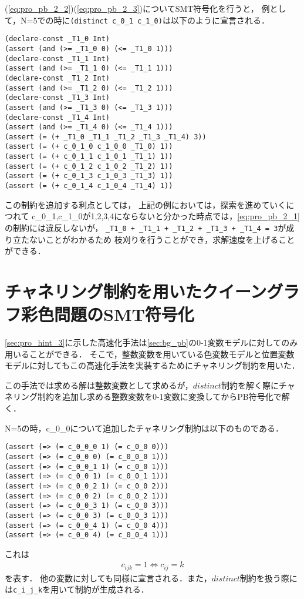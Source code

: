 (\ref{eq:pro_pb_2_2})(\ref{eq:pro_pb_2_3})についてSMT符号化を行うと，
例として，N=5での時に\verb|(distinct c_0_1 c_1_0)|は以下のように宣言される．

{ \footnotesize \begin{verbatim}
(declare-const _T1_0 Int)
(assert (and (>= _T1_0 0) (<= _T1_0 1)))
(declare-const _T1_1 Int)
(assert (and (>= _T1_1 0) (<= _T1_1 1)))
(declare-const _T1_2 Int)
(assert (and (>= _T1_2 0) (<= _T1_2 1)))
(declare-const _T1_3 Int)
(assert (and (>= _T1_3 0) (<= _T1_3 1)))
(declare-const _T1_4 Int)
(assert (and (>= _T1_4 0) (<= _T1_4 1)))
(assert (= (+ _T1_0 _T1_1 _T1_2 _T1_3 _T1_4) 3))
(assert (= (+ c_0_1_0 c_1_0_0 _T1_0) 1))
(assert (= (+ c_0_1_1 c_1_0_1 _T1_1) 1))
(assert (= (+ c_0_1_2 c_1_0_2 _T1_2) 1))
(assert (= (+ c_0_1_3 c_1_0_3 _T1_3) 1))
(assert (= (+ c_0_1_4 c_1_0_4 _T1_4) 1))
\end{verbatim}}

この制約を追加する利点としては，
上記の例においては，探索を進めていくにつれて
c\_0\_1,c\_1\_0が1,2,3,4にならないと分かった時点では，\ref{eq:pro_pb_2_1}の制約には違反しないが，
{\small \verb|_T1_0 + _T1_1 + _T1_2 + _T1_3 + _T1_4 = 3|}が成り立たないことがわかるため
枝刈りを行うことができ，求解速度を上げることができる．



%
%
\section{チャネリング制約を用いたクイーングラフ彩色問題のSMT符号化}\label{sec:pro_pb_c}
\ref{sec:pro_hint_3}に示した高速化手法は\ref{sec:bg_pb}の0-1変数モデルに対してのみ用いることができる．
そこで，整数変数を用いている色変数モデルと位置変数モデルに対してもこの高速化手法を実装するためにチャネリング制約を用いた．

この手法では求める解は整数変数として求めるが，$distinct$制約を解く際にチャネリング制約を追加し求める整数変数を0-1変数に変換してからPB符号化で解く．

N=5の時，c\_0\_0について追加したチャネリング制約は以下のものである．
{ \footnotesize \begin{verbatim}
(assert (=> (= c_0_0_0 1) (= c_0_0 0)))
(assert (=> (= c_0_0 0) (= c_0_0_0 1)))
(assert (=> (= c_0_0_1 1) (= c_0_0 1)))
(assert (=> (= c_0_0 1) (= c_0_0_1 1)))
(assert (=> (= c_0_0_2 1) (= c_0_0 2)))
(assert (=> (= c_0_0 2) (= c_0_0_2 1)))
(assert (=> (= c_0_0_3 1) (= c_0_0 3)))
(assert (=> (= c_0_0 3) (= c_0_0_3 1)))
(assert (=> (= c_0_0_4 1) (= c_0_0 4)))
(assert (=> (= c_0_0 4) (= c_0_0_4 1)))
\end{verbatim}}
これは
\begin{eqnarray}
    c_{ijk} = 1 \Leftrightarrow c_{ij} = k
\end{eqnarray}
を表す．
他の変数に対しても同様に宣言される．また，$distinct$制約を扱う際には\verb|c_i_j_k|を用いて制約が生成される．



